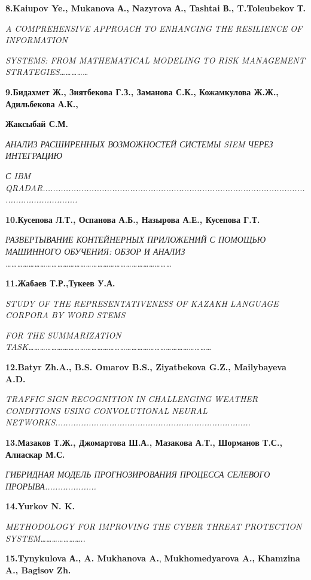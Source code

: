 \textbf{8.Kaiupov Ye., Mukanova А., Nazyrova А., Tashtai В.,
T.Toleubekov Т.}

\emph{A COMPREHENSIVE APPROACH TO ENHANCING THE RESILIENCE OF
INFORMATION}

\emph{SYSTEMS: FROM MATHEMATICAL MODELING TO RISK MANAGEMENT
STRATEGIES\ldots\ldots\ldots\ldots\ldots{}}

\textbf{9.Бидахмет Ж., Зиятбекова Г.З., Заманова С.К., Кожамкулова Ж.Ж.,
Адильбекова А.К.,}

\textbf{Жаксыбай С.М.}

\emph{АНАЛИЗ РАСШИРЕННЫХ ВОЗМОЖНОСТЕЙ СИСТЕМЫ SIEM ЧЕРЕЗ ИНТЕГРАЦИЮ}

\emph{С IBM
QRADAR..................................................................................................................................}

\textbf{10.Кусепова Л.Т., Оспанова А.Б., Назырова А.Е., Кусепова Г.Т.}

\emph{РАЗВЕРТЫВАНИЕ КОНТЕЙНЕРНЫХ ПРИЛОЖЕНИЙ С ПОМОЩЬЮ МАШИННОГО
ОБУЧЕНИЯ: ОБЗОР И АНАЛИЗ
\ldots\ldots\ldots\ldots\ldots\ldots\ldots\ldots\ldots\ldots\ldots\ldots\ldots\ldots\ldots\ldots\ldots\ldots\ldots\ldots\ldots\ldots\ldots\ldots\ldots\ldots\ldots\ldots\ldots{}}

\textbf{11.Жабаев Т.Р.,Тукеев У.А.}

\emph{STUDY OF THE REPRESENTATIVENESS OF KAZAKH LANGUAGE CORPORA BY WORD
STEMS}

\emph{FOR THE SUMMARIZATION
TASK\ldots\ldots\ldots\ldots\ldots\ldots\ldots\ldots\ldots\ldots\ldots\ldots\ldots\ldots\ldots\ldots\ldots\ldots\ldots\ldots\ldots\ldots\ldots\ldots\ldots\ldots\ldots\ldots\ldots\ldots\ldots\ldots{}}

\textbf{12.Batyr Zh.A., B.S. Omarov B.S., Ziyatbekova G.Z., Mailybayeva
A.D.}

\emph{TRAFFIC SIGN RECOGNITION IN CHALLENGING WEATHER CONDITIONS USING
CONVOLUTIONAL NEURAL
NETWORKS............................................................................}

\textbf{13.Мазаков Т.Ж., Джомартова Ш.А., Мазакова А.Т., Шорманов Т.С.,
Алиаскар М.С.}

\emph{ГИБРИДНАЯ МОДЕЛЬ ПРОГНОЗИРОВАНИЯ ПРОЦЕССА СЕЛЕВОГО
ПРОРЫВА....................}

\textbf{14.Yurkov N. K.}

\emph{METHODOLOGY FOR IMPROVING THE CYBER THREAT PROTECTION
SYSTEM\ldots\ldots\ldots\ldots\ldots\ldots\ldots..}

\textbf{15.Tynykulova А., A. Mukhanova A.}, \textbf{Mukhomedyarova A.,}
\textbf{Khamzina A., Bagisov Zh.}

